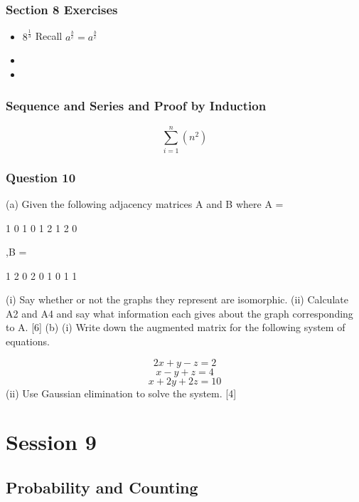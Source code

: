 \documentclass[]{report}
\begin{document}
\subsection*{Section 8 Exercises}
\begin{itemize}
\item $8^{\frac{1}{3}}$ Recall $a^{\frac{b}{c}} = a^{\frac{b}{c}}$
\item
\item
\end{itemize}







\subsection{Sequence and Series and Proof by Induction}


\[\sum^{n}_{i=1} (n^2) \]





\subsection{Question 10}

(a) Given the following adjacency matrices A and B where
A =

1 0 1
0 1 2
1 2 0

,B =

1 2 0
2 0 1
0 1 1



(i) Say whether or not the graphs they represent are isomorphic.
(ii) Calculate A2 and A4 and say what information each gives about the graph
corresponding to A. [6]
(b) (i) Write down the augmented matrix for the following system of equations.

\[2x + y - z = 2\]
\[x - y + z = 4\]
\[x + 2y + 2z = 10\]
(ii) Use Gaussian elimination to solve the system. [4]


\newpage
\chapter{Session 9}
\section{Probability and Counting}
\newpage
\end{document}
